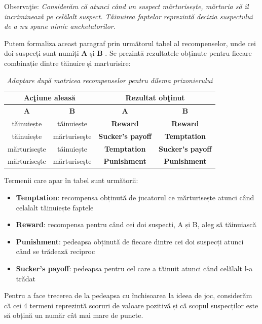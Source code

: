 Observaţie: \textit{Considerăm că atunci când un suspect mărturisește, mărturia să îl incriminează pe celălalt suspect. Tăinuirea faptelor reprezintă decizia suspectului de a nu spune nimic anchetatorilor.}

Putem formaliza aceast paragraf prin următorul tabel al recompenselor, unde cei doi suspecți sunt numiți \textbf{A} și \textbf{B} \cite{plato_stanford}. Se prezintă rezultatele obținute pentru fiecare combinație dintre tăinuire și marturisire:  

\begin{table}[H]
	\centering
	\def\arraystretch{1.75}
	\begin{tabular}{|c|c|c|c|}
		\hline
		\multicolumn{2}{|c|}{\textbf{Acţiune aleasă}} & \multicolumn{2}{c|}{\textbf{Rezultat obţinut}} \\ \hline
		\textbf{A} & \textbf{B} & \textbf{A} & \textbf{B} \\ \hline
		tăinuiește & tăinuiește & \textbf{Reward} & \textbf{Reward} \\ \hline
		tăinuiește & mărturiseşte & \textbf{Sucker's payoff} & \textbf{Temptation} \\ \hline
		mărturiseşte & tăinuiește & \textbf{Temptation} & \textbf{Sucker's payoff} \\ \hline
		mărturiseşte & mărturiseşte & \textbf{Punishment} & \textbf{Punishment} \\ \hline
	\end{tabular}
	\caption{\textit{Adaptare după matricea recompenselor pentru dilema prizonierului}}
	\label{matricea_recompenselor}
\end{table}

Termenii care apar în tabel sunt următorii: 
 
\begin{itemize} 
	\item \textbf{Temptation}: recompensa obținută de jucatorul ce mărturisește atunci când celalalt tăinuiește faptele 
	\item \textbf{Reward}: recompensa pentru când cei doi suspecți, A și B, aleg să tăinuiască 
	\item \textbf{Punishment}: pedeapsa obținută de fiecare dintre cei doi suspecți atunci când se trădează reciproc 
	\item \textbf{Sucker's payoff}: pedeapsa pentru cel care a tăinuit atunci când celălalt l-a trădat 
\end{itemize} 
 
Pentru a face trecerea de la pedeapsa cu închisoarea la ideea de joc, considerăm că cei 4 termeni reprezintă scoruri de valoare pozitivă și că scopul suspecților este să obțină un număr cât mai mare de puncte. 

